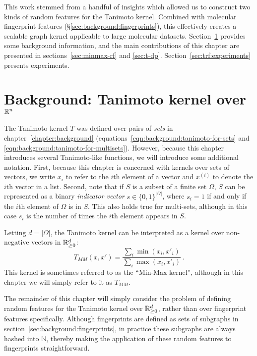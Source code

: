 This work stemmed from a handful of insights which allowed us to construct two kinds of random features for the Tanimoto kernel.
Combined with molecular fingerprint features (\S\ref{sec:background:fingerprints}),
this effectively creates a scalable graph kernel applicable to large molecular datasets.
Section~\ref{sec:trf:background} provides some background information,
and the main contributions of this chapter are presented in
sections~\ref{sec:minmax-rf} and \ref{sec:t-dp}.
Section~\ref{sec:trf:experiments} presents experiments.

\section{Background: Tanimoto kernel over \texorpdfstring{$\mathbb{R}^n$}{Rn}}
\label{sec:trf:background}

The Tanimoto kernel $T$ was defined over pairs of \emph{sets} in chapter~\ref{chapter:background} (equations~\ref{eqn:background:tanimoto-for-sets}
and \ref{eqn:background:tanimoto-for-multisets}).
However, because this chapter introduces several Tanimoto-like functions, we will introduce
some additional notation.
First, because this chapter is concerned with kernels over sets of vectors,
we write $x_i$ to refer to the $i$th element of a vector and $x^{(i)}$ to denote the $i$th vector in a list.
Second, note that if $S$ is a subset of a finite set $\Omega$,
$S$ can be represented as a binary \emph{indicator vector} $s\in\{0,1\}^{|\Omega|}$,
where $s_i=1$ if and only if the $i$th element of $\Omega$ is in $S$.
This also holds true for multi-sets, although in this case $s_i$ is the number of times the $i$th element appears in $S$.

Letting $d=|\Omega|$,
the Tanimoto kernel can be interpreted as a kernel over non-negative vectors in $\mathbb{R}^d_{\geq0}$:
\begin{equation}\label{eqn:minmax-kernel}
    T_{MM}(x, x') = \frac{\sum_i \min(x_i, x'_i)}{\sum_i \max(x_i, x'_i)}\,.
\end{equation}
This kernel is sometimes referred to as the ``Min-Max kernel'',
although in this chapter we will simply refer to it as $T_{MM}$.

The remainder of this chapter will simply consider the problem of defining random features
for the Tanimoto kernel over $\mathbb{R}^d_{\geq0}$,
rather than over fingerprint features specifically.
Although fingerprints are defined as sets of subgraphs in section~\ref{sec:background:fingerprints},
in practice these subgraphs are always hashed into $\mathbb{N}$,
thereby making the application of these random features to fingerprints straightforward.


